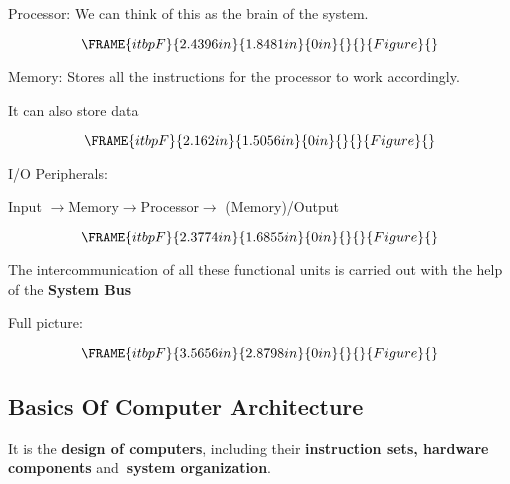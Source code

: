 \documentclass{article}
\begin{document}
Processor: We can think of this as the brain of the system.

\[
\FRAME{itbpF}{2.4396in}{1.8481in}{0in}{}{}{Figure}{\special{language
"Scientific Word";type "GRAPHIC";display "USEDEF";valid_file "T";width
2.4396in;height 1.8481in;depth 0in;original-width 6.6374in;original-height
5.4613in;cropleft "0";croptop "1";cropright "1";cropbottom "0";tempfilename
'SDAC2G01.bmp';tempfile-properties "XPR";}} 
\]

\bigskip

Memory: Stores all the instructions for the processor to work accordingly.

It can also store data

\[
\FRAME{itbpF}{2.162in}{1.5056in}{0in}{}{}{Figure}{\special{language
"Scientific Word";type "GRAPHIC";display "USEDEF";valid_file "T";width
2.162in;height 1.5056in;depth 0in;original-width 6.9514in;original-height
8.1664in;cropleft "0";croptop "1";cropright "1";cropbottom "0";tempfilename
'SDAC7B02.bmp';tempfile-properties "XPR";}} 
\]

\bigskip

I/O Peripherals:

Input $\rightarrow $Memory$\rightarrow $Processor$\rightarrow $%
(Memory)/Output

\[
\FRAME{itbpF}{2.3774in}{1.6855in}{0in}{}{}{Figure}{\special{language
"Scientific Word";type "GRAPHIC";display "USEDEF";valid_file "T";width
2.3774in;height 1.6855in;depth 0in;original-width 3.1765in;original-height
1.7149in;cropleft "0";croptop "1";cropright "1";cropbottom "0";tempfilename
'SDACA903.bmp';tempfile-properties "XPR";}} 
\]

The intercommunication of all these functional units is carried out with the
help of the \textbf{System Bus}

Full picture:

\[
\FRAME{itbpF}{3.5656in}{2.8798in}{0in}{}{}{Figure}{\special{language
"Scientific Word";type "GRAPHIC";display "USEDEF";valid_file "T";width
3.5656in;height 2.8798in;depth 0in;original-width 11.8531in;original-height
8.6663in;cropleft "0";croptop "1";cropright "1";cropbottom "0";tempfilename
'SDACDE04.bmp';tempfile-properties "XPR";}} 
\]

\bigskip

\subsection{Basics Of Computer Architecture}

It is the \textbf{design of computers}, including their \textbf{instruction
sets, hardware components} and\textbf{\ system organization}.
\end{document}
